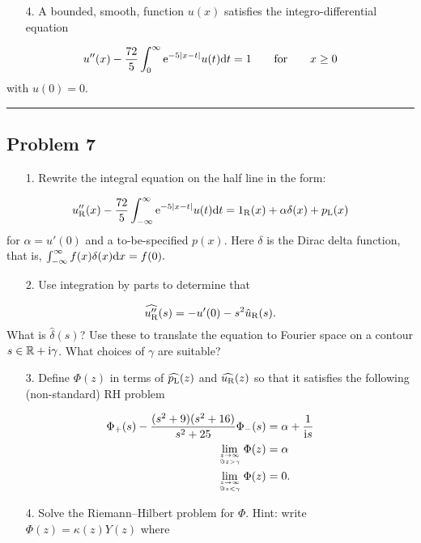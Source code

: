 \documentclass[12pt,a4paper]{article}
\def\qqfor{\qquad\hbox{for}\qquad}
\def\D{ {\rm d} }
\def\I{ {\rm i} }
\def\E{ {\rm e} }
\def\R{ {\mathbb R} }
\def\dx{\D x}
\def\dt{\D t}
\def\rR{ {\rm R} }
\def\rL{ {\rm L} }
\def\endash{–}
\begin{document}
\begin{itemize}
\item[4. ] A bounded, smooth,  function $u(x)$ satisfies the integro-differential equation

\end{itemize}
\[
u''(x) - {72 \over 5} \int_0^\infty \E^{-5 |x-t|} u(t) \dt = 1 \qqfor x \geq 0
\]
with $u(0) = 0$.

\rule{\textwidth}{1pt}
\subsection{Problem 7}
\begin{itemize}
\item[1. ] Rewrite the integral equation on the half line in the form:

\end{itemize}
\[
u_\rR''(x) - {72 \over 5} \int_{-\infty}^\infty \E^{-5 |x-t|} u(t) \dt = 1_\rR(x) + \alpha \delta(x) + p_\rL(x)
\]
for $\alpha = u'(0)$ and a to-be-specified  $p(x)$. Here $\delta$ is  the Dirac delta function, that is, $\int_{-\infty}^\infty f(x) \delta(x) \dx = f(0).$

\begin{itemize}
\item[2. ] Use integration by parts to determine that

\end{itemize}
\[
\widehat{u_{\rm R}''}(s) = -u'(0) -s^2 \hat u_{\rm R}(s).
\]
What is $\hat{\delta}(s)$? Use these to translate the equation to Fourier space on a contour $s \in \R + \I \gamma$. What choices of $\gamma$ are suitable?

\begin{itemize}
\item[3. ] Define $\Phi(z)$ in  terms of $\widehat{p_\rL}(z)$ and $\widehat{u_\rR}(z)$ so that it satisfies the following (non-standard) RH problem

\end{itemize}

\begin{align*}
\Phi_+(s) - {(s^2 + 9) (s^2+16) \over s^2+25} \Phi_-(s) &= \alpha + {1 \over \I s}\\
 \lim_{z \rightarrow \infty\atop \Im z > \gamma}  \Phi(z) &= \alpha \\
  \lim_{z \rightarrow \infty\atop \Im z < \gamma}  \Phi(z) &= 0.
\end{align*}
\begin{itemize}
\item[4. ] Solve the Riemann\ensuremath{\endash}Hilbert problem for $\Phi$. Hint: write $\Phi(z) = \kappa(z) Y(z)$ where

\end{itemize}
\end{document}
